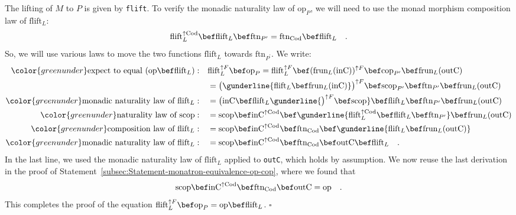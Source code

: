 The lifting of $M$ to $P$ is given by \lstinline!flift!. To verify
the monadic naturality law of $\text{op}_{P}$, we will need to use
the monad morphism composition law of $\text{flift}_{L}$:
\[
\text{flift}_{L}^{\uparrow\text{Cod}}\bef\text{flift}_{L}\bef\text{ftn}_{P^{\prime}}=\text{ftn}_{\text{Cod}}\bef\text{flift}_{L}\quad.
\]
So, we will use various laws to move the two functions $\text{flift}_{L}$
towards $\text{ftn}_{P^{\prime}}$. We write:
\begin{align*}
{\color{greenunder}\text{expect to equal }(\text{op}\bef\text{flift}_{L}):}\quad & \text{flift}_{L}^{\uparrow F}\bef\text{op}_{P}=\text{flift}_{L}^{\uparrow F}\bef(\text{frun}_{L}(\text{inC}))^{\uparrow F}\bef\text{cop}_{P^{\prime}}\bef\text{frun}_{L}(\text{outC})\\
 & =\big(\gunderline{\text{flift}_{L}\bef\text{frun}_{L}(\text{inC})}\big)^{\uparrow F}\bef\text{scop}_{P^{\prime}}\bef\text{ftn}_{P^{\prime}}\bef\text{frun}_{L}(\text{outC})\\
{\color{greenunder}\text{monadic naturality law of }\text{flift}_{L}:}\quad & =\big(\text{inC}\bef\text{flift}_{L}\gunderline{\big)^{\uparrow F}\bef\text{scop}}\bef\text{flift}_{L}\bef\text{ftn}_{P^{\prime}}\bef\text{frun}_{L}(\text{outC})\\
{\color{greenunder}\text{naturality law of }\text{scop}:}\quad & =\text{scop}\bef\text{inC}^{\uparrow\text{Cod}}\bef\gunderline{\text{flift}_{L}^{\uparrow\text{Cod}}\bef\text{flift}_{L}\bef\text{ftn}_{P^{\prime}}}\bef\text{frun}_{L}(\text{outC})\\
{\color{greenunder}\text{composition law of }\text{flift}_{L}:}\quad & =\text{scop}\bef\text{inC}^{\uparrow\text{Cod}}\bef\text{ftn}_{\text{Cod}}\bef\gunderline{\text{flift}_{L}\bef\text{frun}_{L}(\text{outC})}\\
{\color{greenunder}\text{monadic naturality law of }\text{flift}_{L}:}\quad & =\text{scop}\bef\text{inC}^{\uparrow\text{Cod}}\bef\text{ftn}_{\text{Cod}}\bef\text{outC}\bef\text{flift}_{L}\quad.
\end{align*}
In the last line, we used the monadic naturality law of $\text{flift}_{L}$
applied to \lstinline!outC!, which holds by assumption. We now reuse
the last derivation in the proof of Statement~\ref{subsec:Statement-monatron-equivalence-op-cop},
where we found that
\[
\text{scop}\bef\text{inC}^{\uparrow\text{Cod}}\bef\text{ftn}_{\text{Cod}}\bef\text{outC}=\text{op}\quad.
\]
This completes the proof of the equation $\text{flift}_{L}^{\uparrow F}\bef\text{op}_{P}=\text{op}\bef\text{flift}_{L}$.
$\square$

